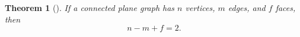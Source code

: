 \documentclass{article}
\begin{document}
\newtheorem{thm}{Theorem}
\begin{thm}[]
If a connected plane graph  has $n$ vertices, $m$ edges, and $f$ faces, then
$$n - m + f = 2.$$
\end{thm}
\end{document}
